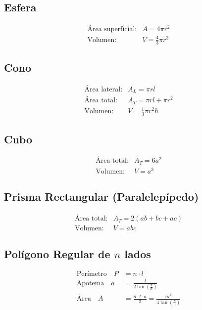 \documentclass[11pt]{article}
\begin{document}
\subsection{Esfera}
\begin{equation*}
\begin{array}{ll}
\text{Área superficial:} & A = 4\pi r^2 \\[5pt]
\text{Volumen:} & V = \frac{4}{3} \pi r^3
\end{array}
\end{equation*}

\subsection{Cono}
\begin{equation*}
\begin{array}{ll}
\text{Área lateral:} & A_L = \pi r l \\[5pt]
\text{Área total:} & A_T = \pi r l + \pi r^2 \\[5pt]
\text{Volumen:} & V = \frac{1}{3} \pi r^2 h
\end{array}
\end{equation*}

\subsection{Cubo}
\begin{equation*}
\begin{array}{ll}
\text{Área total:} & A_T = 6a^2 \\[5pt]
\text{Volumen:} & V = a^3    
\end{array}
\end{equation*}

\subsection{Prisma Rectangular (Paralelepípedo)}
\begin{equation*}
\begin{array}{ll}
\text{Área total:} & A_T = 2(ab + bc + ac) \\[5pt]
\text{Volumen:} & V = abc
\end{array}
\end{equation*}

\subsection{Polígono Regular de \(n\) lados}
\begin{equation*}
\begin{array}{ll}
    \text{Perímetro} \quad P &= n \cdot l \\[5pt]
    \text{Apotema} \quad a &= \frac{l}{2 \tan\left( \frac{\pi}{n} \right)} \\[5pt]
    \text{Área} \quad A &= \frac{n \cdot l \cdot a}{2} = \frac{n l^2}{4 \tan\left( \frac{\pi}{n} \right)}
\end{array}
\end{equation*}
\end{document}
